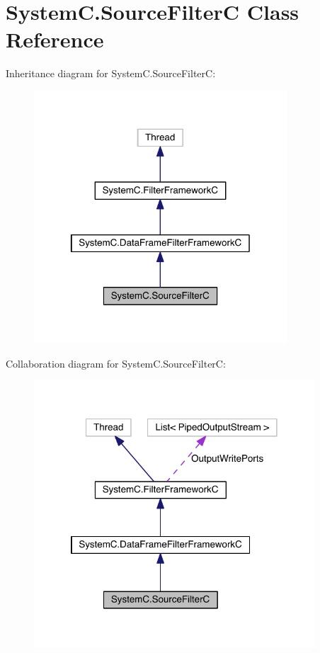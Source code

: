 \hypertarget{class_system_c_1_1_source_filter_c}{}\section{System\+C.\+Source\+Filter\+C Class Reference}
\label{class_system_c_1_1_source_filter_c}


Inheritance diagram for System\+C.\+Source\+Filter\+C\+:
\nopagebreak
\begin{figure}[H]
\begin{center}
\leavevmode
\includegraphics[width=268pt]{class_system_c_1_1_source_filter_c__inherit__graph}
\end{center}
\end{figure}


Collaboration diagram for System\+C.\+Source\+Filter\+C\+:
\nopagebreak
\begin{figure}[H]
\begin{center}
\leavevmode
\includegraphics[width=297pt]{class_system_c_1_1_source_filter_c__coll__graph}
\end{center}
\end{figure}
